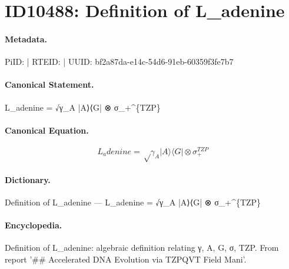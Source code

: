 \section*{ID10488: Definition of L\_adenine}
\paragraph{Metadata.}
PiID:  | RTEID:  | UUID: bf2a87da-e14c-54d6-91eb-60359f3fe7b7

\paragraph{Canonical Statement.}
L\_adenine = √γ\_A |A⟩⟨G| ⊗ σ\_+\textasciicircum{}\{TZP\}

\paragraph{Canonical Equation.}
\[
L_adenine = √γ_A |A⟩⟨G| ⊗ σ_+^{TZP}
\]

\paragraph{Dictionary.}
Definition of L\_adenine — L\_adenine = √γ\_A |A⟩⟨G| ⊗ σ\_+\textasciicircum{}\{TZP\}

\paragraph{Encyclopedia.}
Definition of L\_adenine: algebraic definition relating γ, A, G, σ, TZP. From report '\#\# Accelerated DNA Evolution via TZPQVT Field Mani'.
